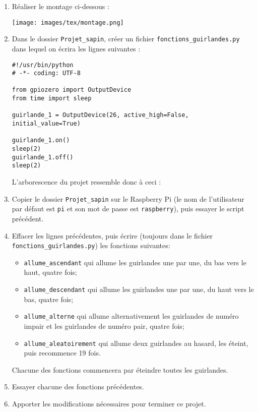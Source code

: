 \documentclass[a4paper]{article}
\begin{document}
\activite
\begin{enumerate}
  \item Réaliser le montage ci-dessous :
    \begin{center}
      \texttt{[image: images/tex/montage.png]}
    \end{center}
  \item Dans le dossier \verb|Projet_sapin|, créer un fichier \verb|fonctions_guirlandes.py| dans lequel on écrira les lignes suivantes :
    \begin{verbatim}
#!/usr/bin/python
# -*- coding: UTF-8

from gpiozero import OutputDevice
from time import sleep

guirlande_1 = OutputDevice(26, active_high=False, initial_value=True)

guirlande_1.on()
sleep(2)
guirlande_1.off()
sleep(2)
    \end{verbatim}
    L'arborescence du projet ressemble donc à ceci :

    \begin{center}
    \end{center}
  \item Copier le dossier \verb|Projet_sapin| sur le Raspberry Pi (le nom de l'utilisateur par défaut est \verb|pi| et son mot de passe est \verb|raspberry|), puis essayer le script précédent.
  \item Effacer les lignes précédentes, puis écrire (toujours dans le fichier \verb|fonctions_guirlandes.py|) les fonctions suivantes:
    \begin{itemize}
      \item \texttt{allume_ascendant} qui allume les guirlandes une par une, du bas vers le haut, quatre fois;
      \item \texttt{allume_descendant} qui allume les guirlandes une par une, du haut vers le bas, quatre fois;
      \item \texttt{allume_alterne} qui allume alternativement les guirlandes de numéro impair et les guirlandes de numéro pair, quatre fois;
      \item \texttt{allume_aleatoirement} qui allume deux guirlandes au hasard, les éteint, puis recommence 19 fois.
    \end{itemize}
    Chacune des fonctions commencera par éteindre toutes les guirlandes.
  \item Essayer chacune des fonctions précédentes.
  \item Apporter les modifications nécessaires pour terminer ce projet.
\end{enumerate}
\end{document}
